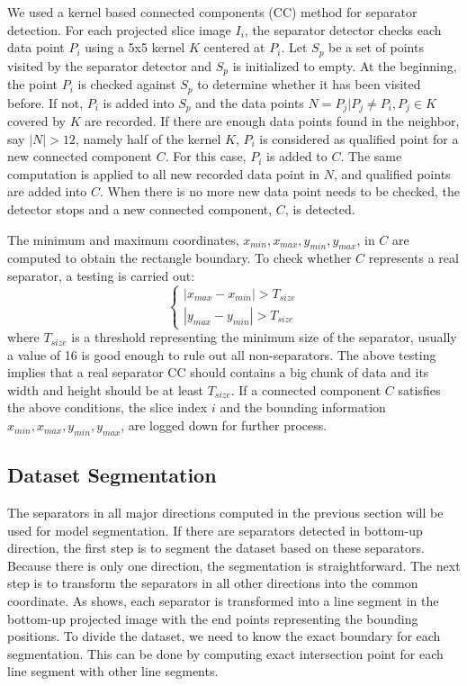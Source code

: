We used a kernel based connected components (CC) method for separator detection. 
For each projected slice image $I_i$, the separator detector 
checks each data point $P_i$ using a 5x5 kernel $K$ centered at $P_i$.
Let $S_p$ be a set of points visited by the separator detector and $S_p$
is initialized to empty.
At the beginning, the point $P_i$ is checked against $S_p$ to 
determine whether it has been visited before. 
If not, $P_i$ is added into $S_p$ and the data points $N={P_j | P_j \neq P_i, P_j \in K}$ 
covered by $K$ are recorded.
If there are enough data points found in the neighbor, say $|N| > 12$, 
namely half of the kernel $K$, 
$P_i$ is considered as qualified point for a new connected component $C$.
For this case, $P_i$ is added to $C$. 
The same computation is applied to all new recorded data point in $N$, and 
qualified points are added into $C$. 
When there is no more new data point needs to be checked, the detector stops
and a new connected component, $C$, is detected.


The minimum and maximum coordinates, $x_{min}, x_{max}, y_{min}, y_{max}$, in $C$
are computed to obtain the rectangle boundary. 
To check whether $C$ represents a real separator, a testing is carried out:
\begin{equation*}
\left\{
\begin{array}{lr}
| x_{max} - x_{min} | > T_{size} \\
| y_{max} - y_{min} | > T_{size}
\end{array} \right.
\end{equation*}
where $T_{size}$ is a threshold representing the minimum size of the separator, 
usually a value of 16 is good enough to rule out all non-separators.
The above testing implies that a real separator CC should contains a big chunk of data
and its width and height should be at least $T_{size}$. 
If a connected component $C$ satisfies the above conditions, 
the slice index $i$ and the bounding information $x_{min}, x_{max}, y_{min}, y_{max}$, 
are logged down for further process.

\subsection{Dataset Segmentation}

The separators in all major directions computed in the previous section will be used for model segmentation.
If there are separators detected in bottom-up direction, the first step is to segment the dataset based on 
these separators. Because there is only one direction, the segmentation is straightforward.
The next step is to transform the separators in all other directions into the common coordinate.
As  shows, each separator is transformed into a line segment in the bottom-up 
projected image with the end points representing the bounding positions.
To divide the dataset, we need to know the exact boundary for each segmentation. 
This can be done by computing exact intersection point for each line segment with other line segments.


